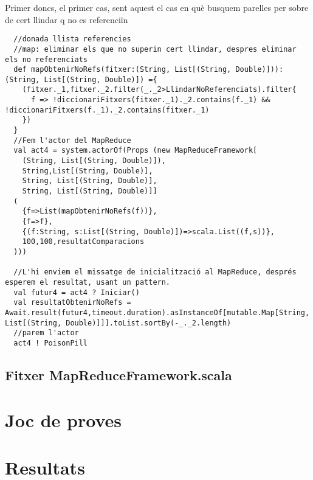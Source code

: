 \documentclass[11pt,a4paper,twoside]{report}
\begin{document}
Primer doncs, el primer cas, sent aquest el cas en què busquem parelles per sobre de cert llindar q no es referenciïn
\begin{lstlisting}
  //donada llista referencies
  //map: eliminar els que no superin cert llindar, despres eliminar els no referenciats
  def mapObtenirNoRefs(fitxer:(String, List[(String, Double)])):(String, List[(String, Double)]) ={
    (fitxer._1,fitxer._2.filter(_._2>LlindarNoReferenciats).filter{
      f => !diccionariFitxers(fitxer._1)._2.contains(f._1) && !diccionariFitxers(f._1)._2.contains(fitxer._1)
    })
  }
  //Fem l'actor del MapReduce
  val act4 = system.actorOf(Props (new MapReduceFramework[
    (String, List[(String, Double)]),
    String,List[(String, Double)],
    String, List[(String, Double)],
    String, List[(String, Double)]]
  (
    {f=>List(mapObtenirNoRefs(f))},
    {f=>f},
    {(f:String, s:List[(String, Double)])=>scala.List((f,s))},
    100,100,resultatComparacions
  )))

  //L'hi enviem el missatge de inicialització al MapReduce, després esperem el resultat, usant un pattern.
  val futur4 = act4 ? Iniciar()
  val resultatObtenirNoRefs = Await.result(futur4,timeout.duration).asInstanceOf[mutable.Map[String, List[(String, Double)]]].toList.sortBy(-_._2.length)
  //parem l'actor
  act4 ! PoisonPill
\end{lstlisting}




\section{Fitxer MapReduceFramework.scala}




\chapter{Joc de proves}

\chapter{Resultats}
\end{document}
